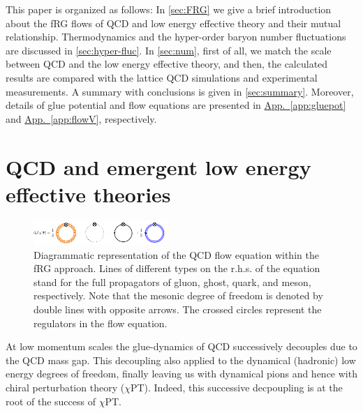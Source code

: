 \documentclass[%
reprint,
superscriptaddress,
showpacs,preprintnumbers,
amsmath,amssymb,
aps,
prd,
]{revtex4-1}
\begin{document}
	This paper is organized as follows: In \autoref{sec:FRG} we give a brief introduction about the fRG flows of QCD and low energy effective theory and their mutual relationship. Thermodynamics and the hyper-order baryon number fluctuations are discussed in \autoref{sec:hyper-fluc}. In \autoref{sec:num}, first of all, we match the scale between QCD and the low energy effective theory, and then, the calculated results are compared with the lattice QCD simulations and experimental measurements. A summary with conclusions is given in \autoref{sec:summary}. Moreover, details of glue potential and flow equations are presented in \hyperref[app:gluepot]{App.~\ref{app:gluepot}} and \hyperref[app:flowV]{App.~\ref{app:flowV}}, respectively.
	
	
	
	
	
	\section{QCD and emergent low energy effective theories}
	\label{sec:FRG}
	
	\begin{figure}[t]
		\includegraphics[width=0.45\textwidth]{QCD_equation}
		\caption{Diagrammatic representation of the QCD flow equation within the fRG approach. Lines of different types on the r.h.s. of the equation stand for the full propagators of gluon, ghost, quark, and meson, respectively. Note that the mesonic degree of freedom is denoted by double lines with opposite arrows. The crossed circles represent the regulators in the flow equation.}\label{fig:QCD_equation}
	\end{figure}
	
	At low momentum scales the glue-dynamics of QCD successively decouples due to the QCD mass gap. This decoupling also applied to the dynamical (hadronic) low energy degrees of freedom, finally leaving us with dynamical pions and hence with chiral perturbation theory ($\chi$PT). Indeed, this successive decpoupling is at the root of the success of $\chi$PT. 
	
\end{document}
